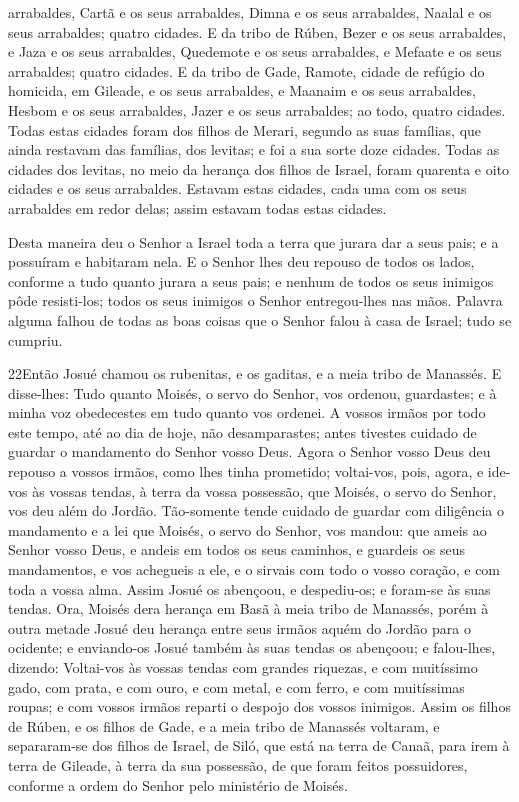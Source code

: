 arrabaldes, Cartã e os seus arrabaldes, Dimna e os seus
arrabaldes, Naalal e os seus arrabaldes; quatro cidades. E da
tribo de Rúben, Bezer e os seus arrabaldes, e Jaza e os seus
arrabaldes, Quedemote e os seus arrabaldes, e Mefaate e os
seus arrabaldes; quatro cidades. E da tribo de Gade, Ramote,
cidade de refúgio do homicida, em Gileade, e os seus arrabaldes, e
Maanaim e os seus arrabaldes, Hesbom e os seus arrabaldes,
Jazer e os seus arrabaldes; ao todo, quatro cidades. Todas
estas cidades foram dos filhos de Merari, segundo as suas famílias,
que ainda restavam das famílias, dos levitas; e foi a sua sorte doze
cidades. Todas as cidades dos levitas, no meio da herança dos
filhos de Israel, foram quarenta e oito cidades e os seus
arrabaldes. Estavam estas cidades, cada uma com os seus
arrabaldes em redor delas; assim estavam todas estas cidades.

Desta maneira deu o Senhor a Israel toda a terra que jurara dar a
seus pais; e a possuíram e habitaram nela. E o Senhor lhes
deu repouso de todos os lados, conforme a tudo quanto jurara a seus
pais; e nenhum de todos os seus inimigos pôde resisti-los; todos os
seus inimigos o Senhor entregou-lhes nas mãos. Palavra alguma
falhou de todas as boas coisas que o Senhor falou à casa de Israel;
tudo se cumpriu.

\medskip

\lettrine{22} Então Josué chamou os rubenitas, e os gaditas, e
a meia tribo de Manassés. E disse-lhes: Tudo quanto Moisés, o
servo do Senhor, vos ordenou, guardastes; e à minha voz obedecestes
em tudo quanto vos ordenei. A vossos irmãos por todo este tempo,
até ao dia de hoje, não desamparastes; antes tivestes cuidado de
guardar o mandamento do Senhor vosso Deus. Agora o Senhor vosso
Deus deu repouso a vossos irmãos, como lhes tinha prometido;
voltai-vos, pois, agora, e ide-vos às vossas tendas, à terra da
vossa possessão, que Moisés, o servo do Senhor, vos deu além do
Jordão. Tão-somente tende cuidado de guardar com diligência o
mandamento e a lei que Moisés, o servo do Senhor, vos mandou: que
ameis ao Senhor vosso Deus, e andeis em todos os seus caminhos, e
guardeis os seus mandamentos, e vos achegueis a ele, e o sirvais com
todo o vosso coração, e com toda a vossa alma. Assim Josué os
abençoou, e despediu-os; e foram-se às suas tendas. Ora, Moisés
dera herança em Basã à meia tribo de Manassés, porém à outra metade
Josué deu herança entre seus irmãos aquém do Jordão para o ocidente;
e enviando-os Josué também às suas tendas os abençoou; e
falou-lhes, dizendo: Voltai-vos às vossas tendas com grandes
riquezas, e com muitíssimo gado, com prata, e com ouro, e com metal,
e com ferro, e com muitíssimas roupas; e com vossos irmãos reparti o
despojo dos vossos inimigos. Assim os filhos de Rúben, e os
filhos de Gade, e a meia tribo de Manassés voltaram, e separaram-se
dos filhos de Israel, de Siló, que está na terra de Canaã, para irem
à terra de Gileade, à terra da sua possessão, de que foram feitos
possuidores, conforme a ordem do Senhor pelo ministério de Moisés.


